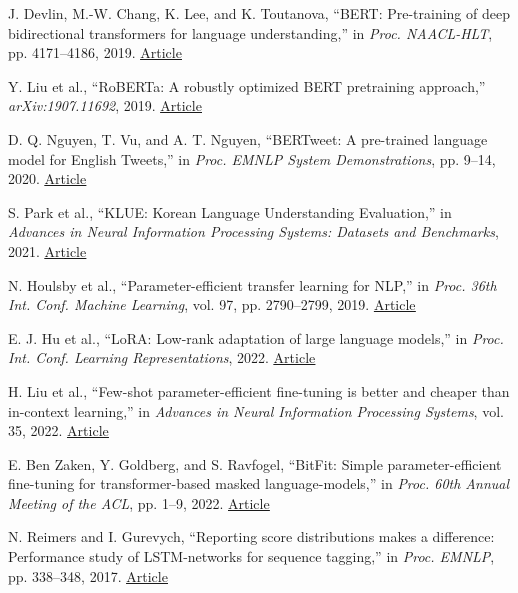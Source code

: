\documentclass{SPC}
\begin{document}
\begin{reference}

 J. Devlin, M.-W. Chang, K. Lee, and K. Toutanova, ``BERT: Pre-training of deep bidirectional transformers for language understanding,'' in \textit{Proc. NAACL-HLT}, pp. 4171--4186, 2019. \href{https://doi.org/10.18653/v1/N19-1423}{\underline{Article}}

 Y. Liu et al., ``RoBERTa: A robustly optimized BERT pretraining approach,'' \textit{arXiv:1907.11692}, 2019. \href{https://doi.org/10.48550/arXiv.1907.11692}{\underline{Article}}

 D. Q. Nguyen, T. Vu, and A. T. Nguyen, ``BERTweet: A pre-trained language model for English Tweets,'' in \textit{Proc. EMNLP System Demonstrations}, pp. 9--14, 2020. \href{https://doi.org/10.18653/v1/2020.emnlp-demos.2}{\underline{Article}}

 S. Park et al., ``KLUE: Korean Language Understanding Evaluation,'' in \textit{Advances in Neural Information Processing Systems: Datasets and Benchmarks}, 2021. \href{https://arxiv.org/abs/2105.09680}{\underline{Article}}

 N. Houlsby et al., ``Parameter-efficient transfer learning for NLP,'' in \textit{Proc. 36th Int. Conf. Machine Learning}, vol. 97, pp. 2790--2799, 2019. \href{https://proceedings.mlr.press/v97/houlsby19a.html}{\underline{Article}}

 E. J. Hu et al., ``LoRA: Low-rank adaptation of large language models,'' in \textit{Proc. Int. Conf. Learning Representations}, 2022. \href{https://openreview.net/forum?id=nZeVKeeFYf9}{\underline{Article}}

 H. Liu et al., ``Few-shot parameter-efficient fine-tuning is better and cheaper than in-context learning,'' in \textit{Advances in Neural Information Processing Systems}, vol. 35, 2022. \href{https://openreview.net/forum?id=rBCvMG-JsPd}{\underline{Article}}

 E. Ben Zaken, Y. Goldberg, and S. Ravfogel, ``BitFit: Simple parameter-efficient fine-tuning for transformer-based masked language-models,'' in \textit{Proc. 60th Annual Meeting of the ACL}, pp. 1--9, 2022. \href{https://doi.org/10.18653/v1/2022.acl-short.1}{\underline{Article}}

 N. Reimers and I. Gurevych, ``Reporting score distributions makes a difference: Performance study of LSTM-networks for sequence tagging,'' in \textit{Proc. EMNLP}, pp. 338--348, 2017. \href{https://doi.org/10.18653/v1/D17-1035}{\underline{Article}}


\end{reference}
\end{document}
